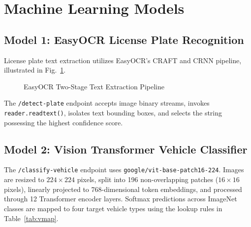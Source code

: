 \documentclass[conference,10pt]{IEEEtran}
\begin{document}
\section{Machine Learning Models}

\subsection{Model 1: EasyOCR License Plate Recognition}

License plate text extraction utilizes EasyOCR's CRAFT and CRNN pipeline, illustrated in Fig.~\ref{fig:ocr_pipeline}.

\begin{figure}[ht]
\centering
{}
\caption{EasyOCR Two-Stage Text Extraction Pipeline}
\label{fig:ocr_pipeline}
\end{figure}

The \texttt{/detect-plate} endpoint accepts image binary streams, invokes \texttt{reader.readtext()}, isolates text bounding boxes, and selects the string possessing the highest confidence score.

\subsection{Model 2: Vision Transformer Vehicle Classifier}

The \texttt{/classify-vehicle} endpoint uses \texttt{google/vit-base-patch16-224}. Images are resized to $224\times224$ pixels, split into 196 non-overlapping patches ($16\times16$ pixels), linearly projected to 768-dimensional token embeddings, and processed through 12 Transformer encoder layers. Softmax predictions across ImageNet classes are mapped to four target vehicle types using the lookup rules in Table~\ref{tab:vmap}.
\end{document}
